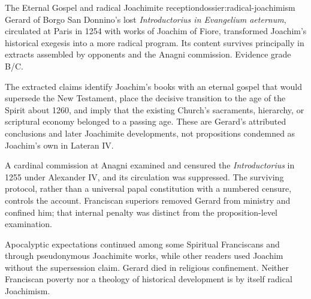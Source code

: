 \begin{heresydossier}{The Eternal Gospel and radical Joachimite reception}{dossier:radical-joachimism}
\objectfield Gerard of Borgo San Donnino's lost \emph{Introductorius in Evangelium aeternum}, circulated at Paris in 1254 with works of Joachim of Fiore, transformed Joachim's historical exegesis into a more radical program. Its content survives principally in extracts assembled by opponents and the Anagni commission. Evidence grade B/C.

\propositionfield The extracted claims identify Joachim's books with an eternal gospel that would supersede the New Testament, place the decisive transition to the age of the Spirit about 1260, and imply that the existing Church's sacraments, hierarchy, or scriptural economy belonged to a passing age. These are Gerard's attributed conclusions and later Joachimite developments, not propositions condemned as Joachim's own in Lateran IV.

\responsefield A cardinal commission at Anagni examined and censured the \emph{Introductorius} in 1255 under Alexander IV, and its circulation was suppressed. The surviving protocol, rather than a universal papal constitution with a numbered censure, controls the account. Franciscan superiors removed Gerard from ministry and confined him; that internal penalty was distinct from the proposition-level examination.

\aftermathfield Apocalyptic expectations continued among some Spiritual Franciscans and through pseudonymous Joachimite works, while other readers used Joachim without the supersession claim. Gerard died in religious confinement. Neither Franciscan poverty nor a theology of historical development is by itself radical Joachimism.
\end{heresydossier}

